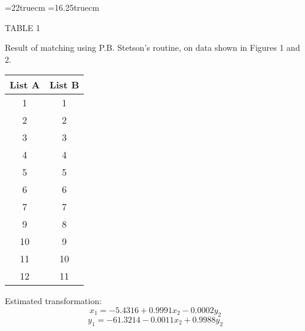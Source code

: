 \textheight=22truecm
\textwidth=16.25truecm


\begin{table}
\begin{center}

TABLE 1

\smallskip

Result of matching using P.B. Stetson's routine, on data shown in 
Figures 1 and 2.

\bigskip

\bigskip

\bigskip


\begin{tabular}{c c} \hline
List A  & List B \\ \hline
1  &  1 \\
2  &  2 \\
3  &  3 \\
4  & 4 \\
5 & 5 \\
6 & 6 \\
7 & 7 \\
9 & 8 \\
10 & 9 \\
11 & 10 \\
12 & 11 \\ \hline \hline
\end{tabular}

\bigskip

\bigskip

Estimated transformation:
$$ x_1 = -5.4316 + 0.9991 x_2  - 0.0002 y_2 $$
$$ y_1 = -61.3214  - 0.0011 x_2 + 0.9988 y_2 $$

\bigskip

\bigskip

\bigskip

\bigskip

\bigskip

\bigskip

\end{center}

\end{table}

\ \ 

\newpage

\ \ 

